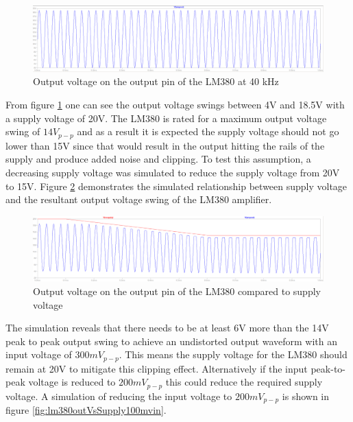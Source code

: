 \begin{figure}[ht!]
    \centering
    \includegraphics[width=\textwidth]{Figures/Design/amplifier/vamp.png}
    \caption{Output voltage on the output pin of the LM380 at 40 kHz}
    \label{fig:lm380outsim}
\end{figure}

From figure \ref{fig:lm380outsim} one can see the output voltage swings between 4V and 18.5V with a supply voltage of 20V. The LM380 is rated for a maximum output voltage swing of $14V_{p-p}$ and as a result it is expected the supply voltage should not go lower than 15V since that would result in the output hitting the rails of the supply and produce added noise and clipping. To test this assumption, a decreasing supply voltage was simulated to reduce the supply voltage from 20V to 15V. Figure \ref{fig:lm380outVsSupply} demonstrates the simulated relationship between supply voltage and the resultant output voltage swing of the LM380 amplifier.

\begin{figure}[ht!]
    \centering
    \includegraphics[width=\textwidth]{Figures/Design/amplifier/vsupplyvsVampOut.png}
    \caption{Output voltage on the output pin of the LM380 compared to supply voltage}
    \label{fig:lm380outVsSupply}
\end{figure}

The simulation reveals that there needs to be at least 6V more than the 14V peak to peak output swing to achieve an undistorted output waveform with an input voltage of $300mV_{p-p}$. This means the supply voltage for the LM380 should remain at 20V to mitigate this clipping effect. Alternatively if the input peak-to-peak voltage is reduced to $200mV_{p-p}$ this could reduce the required supply voltage. A simulation of reducing the input voltage to $200mV_{p-p}$ is shown in figure \ref{fig:lm380outVsSupply100mvin}.


